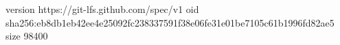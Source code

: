 version https://git-lfs.github.com/spec/v1
oid sha256:eb8db1eb42ee4e25092fc238337591f38e06fe31e01be7105c61b1996fd82ae5
size 98400

